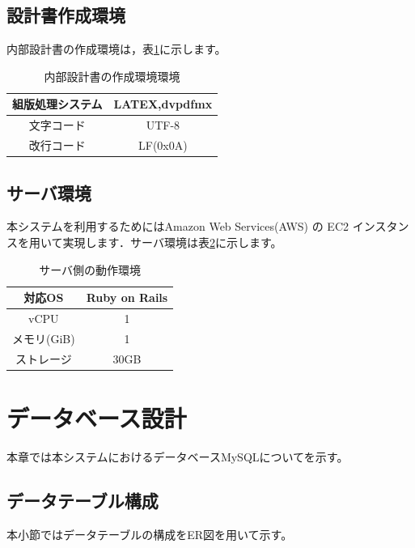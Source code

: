 \documentclass[a4j]{jarticle}
\begin{document}
\subsection{設計書作成環境}
内部設計書の作成環境は，表\ref{tab:creating_environment}に示します。
\begin{table}[htb]
\caption{内部設計書の作成環境環境}
\begin{center}
  \begin{tabular}{|c|c|} \hline
    組版処理システム & LATEX,dvpdfmx\\ \hline
   文字コード &  UTF-8\\ \hline
    改行コード & LF(0x0A)  \\ \hline
  \end{tabular}
\label{tab:creating_environment}
\end{center}
\end{table}
\subsection{サーバ環境}
本システムを利用するためにはAmazon Web Services(AWS) の EC2 インスタンスを用いて実現します．サーバ環境は表\ref{tab:server_environment}に示します。
\begin{table}[htb]
\caption{サーバ側の動作環境}
\begin{center}
  \begin{tabular}{|c|c|} \hline
    対応OS & Ruby on Rails \\ \hline
   vCPU & 1\\ \hline
    メモリ(GiB) & 1  \\ \hline
    ストレージ & 30GB \\ \hline
  \end{tabular}
\label{tab:server_environment}
\end{center}
\end{table}
\section{データベース設計}
本章では本システムにおけるデータベースMySQLについてを示す。

\subsection{データテーブル構成}
本小節ではデータテーブルの構成をER図を用いて示す。
\end{document}
